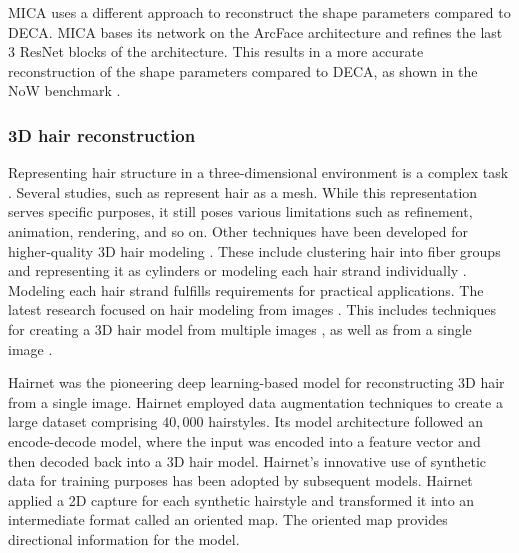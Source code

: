 MICA uses a different approach to reconstruct the shape parameters compared to DECA. MICA bases its network on the ArcFace architecture \cite{dengSubcenterArcFaceBoosting2020} and refines the last 3 ResNet blocks of the architecture. This results in a more accurate reconstruction of the shape parameters compared to DECA, as shown in the NoW benchmark \cite{RingNet:CVPR:2019}.


\subsubsection{3D hair reconstruction}
Representing hair structure in a three-dimensional environment is a complex task \cite{wardSurveyHairModeling2007}. Several studies, such as \cite{dengRetinaFaceSinglestageDense2019,papadopoulosFaceGCNGraphConvolutional2021,saitoPIFuPixelAlignedImplicit2019,zeng3DHumanMesh2020} represent hair as a mesh. While this representation serves specific purposes, it still poses various limitations such as refinement, animation, rendering, and so on.
Other techniques have been developed for higher-quality 3D hair modeling \cite{wardSurveyHairModeling2007}. These include clustering hair into fiber groups and representing it as cylinders \cite{cluster} or modeling each hair strand individually \cite{wardSurveyHairModeling2007}. Modeling each hair strand fulfills requirements for practical applications.
The latest research focused on hair modeling from images \cite{baoSurveyImageBasedTechniques2018}. This includes techniques for creating a 3D hair model from multiple images \cite{zhangDatadrivenApproachFourview2017}, as well as from a single image \cite{meng,hairimg2,hairimg4}.



Hairnet \cite{zhouHairNetSingleViewHair2018} was the pioneering deep learning-based model for reconstructing 3D hair from a single image. Hairnet employed data augmentation techniques to create a large dataset comprising $40,000$ hairstyles. Its model architecture followed an encode-decode model, where the input was encoded into a feature vector and then decoded back into a 3D hair model. Hairnet's innovative use of synthetic data for training purposes has been adopted by subsequent models. Hairnet applied a 2D capture for each synthetic hairstyle and transformed it into an intermediate format called an oriented map. The oriented map provides directional information for the model.

